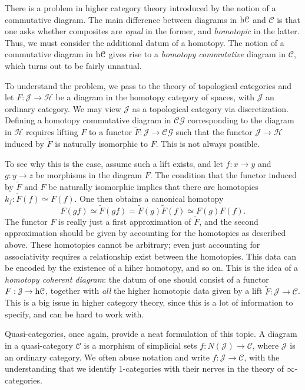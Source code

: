 There is a problem in higher category theory introduced by the notion of a commutative diagram. The main difference between diagrams in $\mathrm{h} \mathcal{C} $ and $\mathcal{C} $ is that one asks whether composites are \emph{equal} in the former, and \emph{homotopic} in the latter. Thus, we must consider the additional datum of a homotopy. The notion of a commutative diagram in $\mathrm{h} \mathcal{C} $ gives rise to a \emph{homotopy commutative} diagram in $\mathcal{C} $, which turns out to be fairly unnatual.

To understand the problem, we pass to the theory of topological categories and let $F : \mathcal{J}  \to \mathcal{H} $ be a diagram in the homotopy category of spaces, with $\mathcal{J} $ an ordinary category. We may view $\mathcal{J}$ as a topological category via discretization. Defining a homotopy commutative diagram in $\mathcal{C} \mathcal{G} $ corresponding to the diagram in $\mathcal{H} $ requires lifting $F$ to a functor $\widetilde{F} : \mathcal{J}  \to \mathcal{C} \mathcal{G} $ such that the functor $\mathcal{J} \to \mathcal{H} $ induced by $\widetilde{F} $ is naturally isomorphic to $F$. This is not always possible.

To see why this is the case, assume such a lift exists, and let $f : x \to y$ and $g : y \to z$ be morphisms in the diagram $F$. The condition that the functor induced by $\widetilde{F} $ and $F$ be naturally isomorphic implies that there are homotopies $k_f : \widetilde{F} (f)\simeq F(f)$. One then obtains a canonical homotopy
\[
	F(gf)\simeq \widetilde{F} (gf)=\widetilde{F} (g)\widetilde{F} (f)\simeq F(g)F(f)
.\]
The functor $F$ is really just a first approximation of $\widetilde{F} $, and the second approximation should be given by accounting for the homotopies as described above. These homotopies cannot be arbitrary; even just accounting for associativity requires a relationship exist between the homotopies. This data can be encoded by the existence of a hiher homotopy, and so on. This is the idea of a \emph{homotopy coherent diagram}: the datum of one should consist of a functor $F : \mathcal{J}  \to \mathrm{h} \mathcal{C} $, together with \emph{all} the higher homotopic data given by a lift $\widetilde{F} : \mathcal{J}  \to \mathcal{C} $. This is a big issue in higher category theory, since this is a lot of information to specify, and can be hard to work with.

Quasi-categories, once again, provide a neat formulation of this topic. A diagram in a quasi-category $\mathcal{C} $ is a morphism of simplicial sets $f : N(\mathcal{J} ) \to \mathcal{C} $, where $\mathcal{J} $ is an ordinary category. We often abuse notation and write $f : \mathcal{J}  \to \mathcal{C} $, with the understanding that we identify 1-categories with their nerves in the theory of $\infty $-categories.


